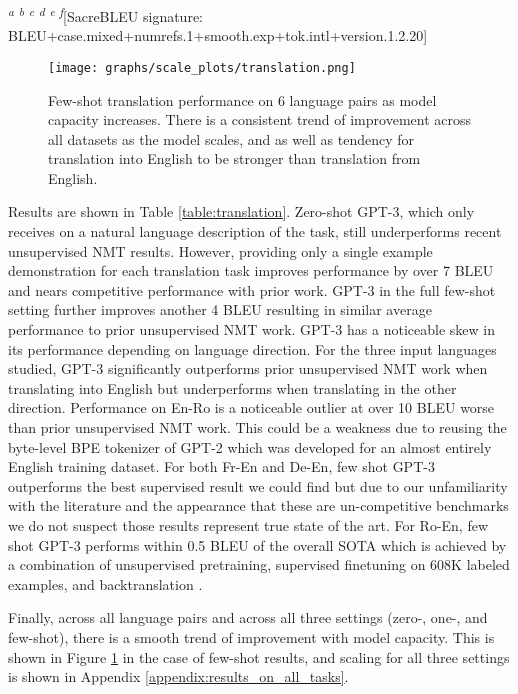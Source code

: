 \documentclass{article}
\begin{document}
\begin{table}
{    \textsuperscript{\textit{a}}\cite{edunov2018understanding}
    \textsuperscript{\textit{b}}\cite{durrani2014edinburgh}
    \textsuperscript{\textit{c}}\cite{wang2018multi}
    \textsuperscript{\textit{d}}\cite{wmt16deensota} 
    \textsuperscript{\textit{e}}\cite{liu2020multilingual}
    \textsuperscript{\textit{f}}[SacreBLEU signature: BLEU+case.mixed+numrefs.1+smooth.exp+tok.intl+version.1.2.20] }
    \label{table:translation}
\end{table} \begin{figure}
\centering\texttt{[image: graphs/scale\_plots/translation.png]}
\caption{Few-shot translation performance on 6 language pairs as model capacity increases.  There is a consistent trend of improvement across all datasets as the model scales, and as well as tendency for translation into English to be stronger than translation from English.}
\label{graph:translation}
\end{figure}     

Results are shown in Table \ref{table:translation}. Zero-shot GPT-3, which only receives on a natural language description of the task, still underperforms recent unsupervised NMT results. However, providing only a single example demonstration for each translation task improves performance by over 7 BLEU and nears competitive performance with prior work. GPT-3 in the full few-shot setting further improves another 4 BLEU resulting in similar average performance to prior unsupervised NMT work. GPT-3 has a noticeable skew in its performance depending on language direction. For the three input languages studied, GPT-3 significantly outperforms prior unsupervised NMT work when translating into English but underperforms when translating in the other direction. Performance on En-Ro is a noticeable outlier at over 10 BLEU worse than prior unsupervised NMT work. This could be a weakness due to reusing the byte-level BPE tokenizer of GPT-2 which was developed for an almost entirely English training dataset. For both Fr-En and De-En, few shot GPT-3 outperforms the best supervised result we could find but due to our unfamiliarity with the literature and the appearance that these are un-competitive benchmarks we do not suspect those results represent true state of the art. For Ro-En, few shot GPT-3 performs within 0.5 BLEU of the overall SOTA which is achieved by a combination of unsupervised pretraining, supervised finetuning on 608K labeled examples, and backtranslation \cite{liu2019multi}.

Finally, across all language pairs and across all three settings (zero-, one-, and few-shot), there is a smooth trend of improvement with model capacity.  This is shown in Figure \ref{graph:translation} in the case of few-shot results, and scaling for all three settings is shown in Appendix \ref{appendix:results_on_all_tasks}.
\end{document}
